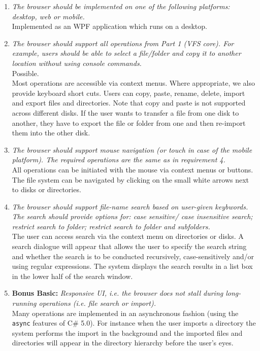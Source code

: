 \documentclass[a4paper,12pt]{article}
\begin{document}
\begin{enumerate}
	\item \emph{The browser should be implemented on one of the following platforms: desktop, web or mobile.}\\
		Implemented as an WPF application which runs on a desktop.\\
	\item \emph{The browser should support all operations from Part 1 (VFS core). For example, users should be able to select a file/folder and copy it to another location without using console commands.}\\
		Possible.\\
		Most operations are accessible via context menus. Where appropriate, we also provide keyboard short cuts. Users can copy, paste, rename, delete, import and export files and directories. 
Note that copy and paste is not supported across different disks. 
If the user wants to transfer a file from one disk to another, they have to export the file or folder from one and then re-import them into the other disk.
	\item \emph{The browser should support mouse navigation (or touch in case of the mobile platform). The required operations are the same as in requirement 4.}\\
		All operations can be initiated with the mouse via context menus or buttons. The file system can be navigated by clicking on the small white arrows next to disks or directories.
	\item \emph{The browser should support file-name search based on user-given keybwords. The search should provide options for: case sensitive/ case insensitive search; restrict search to folder; restrict search to folder and subfolders.}\\
		The user can access search via the context menu on directories or disks. A search dialogue will appear that allows the user to specify the search string and whether the search is to be conducted recursively, case-sensitively and/or using regular expressions. 
The system displays the search results in a list box in the lower half of the search window.
	\item \textbf{Bonus Basic:} \emph{Responsive UI, i.e. the browser does not stall during long-running operations (i.e. file search or import).}\\
		Many operations are implemented in an asynchronous fashion (using the \lstinline!async! features of C\# 5.0). 
For instance when the user imports a directory the system performs the import in the background and the imported files and directories will appear in the directory hierarchy before the user's eyes.

\end{enumerate}
\end{document}
